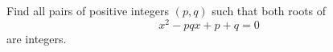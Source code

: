 Find all pairs of positive integers $(p,q)$ such that both roots of
\[
x^2-pqx+p+q=0
\]
are integers.
